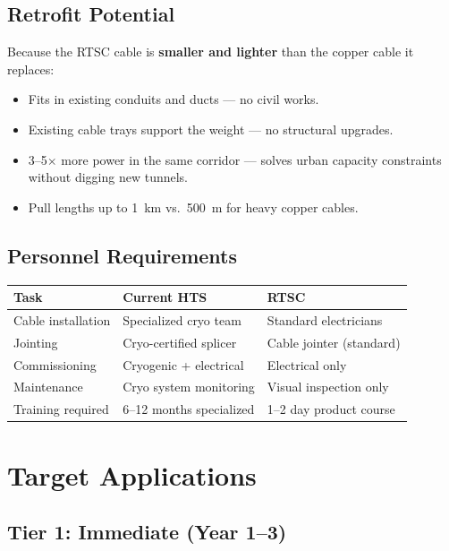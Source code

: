 \documentclass[11pt, a4paper]{article}
\begin{document}
\subsection{Retrofit Potential}

Because the RTSC cable is \textbf{smaller and lighter} than the
copper cable it replaces:

\begin{itemize}[nosep]
  \item Fits in existing conduits and ducts --- no civil works.
  \item Existing cable trays support the weight --- no structural
        upgrades.
  \item 3--5$\times$ more power in the same corridor --- solves
        urban capacity constraints without digging new tunnels.
  \item Pull lengths up to 1~km vs.\ 500~m for heavy copper cables.
\end{itemize}

\subsection{Personnel Requirements}

\begin{center}
\begin{tabular}{@{}lll@{}}
\toprule
\textbf{Task} & \textbf{Current HTS} & \textbf{RTSC} \\
\midrule
Cable installation & Specialized cryo team & Standard electricians \\
Jointing & Cryo-certified splicer & Cable jointer (standard) \\
Commissioning & Cryogenic + electrical & Electrical only \\
Maintenance & Cryo system monitoring & Visual inspection only \\
Training required & 6--12 months specialized & 1--2 day product course \\
\bottomrule
\end{tabular}
\end{center}

\section{Target Applications}
\label{sec:applications}

\subsection{Tier 1: Immediate (Year 1--3)}
\end{document}
